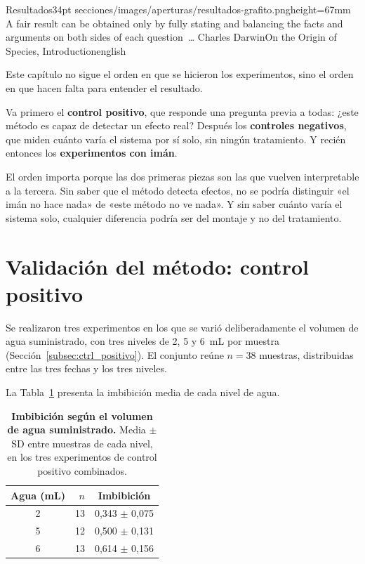 \aperturacapitulo
  {Resultados}{34pt}
  {secciones/images/aperturas/resultados-grafito.png}{height=67mm}
  {A fair result can be obtained only by fully stating and balancing the facts and arguments on both sides of each question~\ldots}
  {Charles Darwin}{On the Origin of Species, Introduction}{english}

Este capítulo no sigue el orden en que se hicieron los experimentos, sino el orden en que hacen falta para entender el resultado.

Va primero el \textbf{control positivo}, que responde una pregunta previa a todas: ¿este método es capaz de detectar un efecto real? Después los \textbf{controles negativos}, que miden cuánto varía el sistema por sí solo, sin ningún tratamiento. Y recién entonces los \textbf{experimentos con imán}.

El orden importa porque las dos primeras piezas son las que vuelven interpretable a la tercera. Sin saber que el método detecta efectos, no se podría distinguir «el imán no hace nada» de «este método no ve nada». Y sin saber cuánto varía el sistema solo, cualquier diferencia podría ser del montaje y no del tratamiento.

\section{Validación del método: control positivo}
\label{sec:res_ctrl_positivo}

Se realizaron tres experimentos en los que se varió deliberadamente el volumen de agua suministrado, con tres niveles de 2, 5 y 6~mL por muestra (Sección~\ref{subsec:ctrl_positivo}). El conjunto reúne \(n = 38\) muestras, distribuidas entre las tres fechas y los tres niveles.

La Tabla~\ref{tab:ctrl_pos_niveles} presenta la imbibición media de cada nivel de agua.

\begin{table}[tbp]
\small
\setlength{\tabcolsep}{3pt}
\centering
\begin{threeparttable}
\caption[Imbibición según el volumen de agua suministrado]{\textbf{Imbibición según el volumen de agua suministrado.} Media \(\pm\) SD entre muestras de cada nivel, en los tres experimentos de control positivo combinados.}
\label{tab:ctrl_pos_niveles}
\begin{tabular}{crc}
\toprule
Agua (mL) & \(n\) & Imbibición \\
\midrule
2 & 13 & 0,343 \(\pm\) 0,075 \\
5 & 12 & 0,500 \(\pm\) 0,131 \\
6 & 13 & 0,614 \(\pm\) 0,156 \\
\bottomrule
\end{tabular}
\end{threeparttable}
\end{table}

